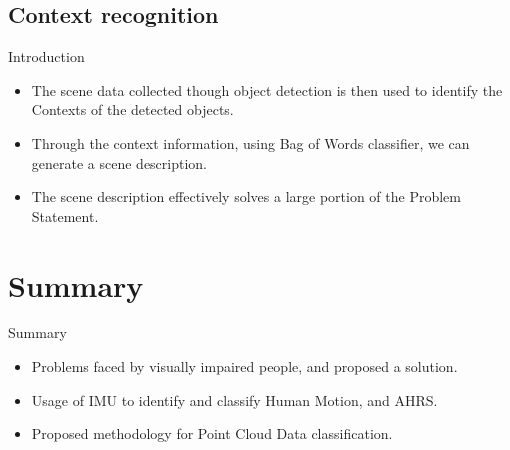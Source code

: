 \documentclass{beamer}
\begin{document}
\subsection{Context recognition}
\begin{frame}{Introduction}
  \begin{itemize}
  \item {
    The scene data collected though object detection is then used to identify the Contexts of the detected objects.
  }
  \item {
    Through the context information, using Bag of Words classifier, we can generate a scene description.
  }
  \item {
    The scene description effectively solves a large portion of the Problem Statement.
  }
  \end{itemize}
\end{frame}

\section*{Summary}

\begin{frame}{Summary}
  \begin{itemize}
  \item {
    Problems faced by visually impaired people, and proposed a solution.
  }
  \item {
    Usage of IMU to identify and classify Human Motion, and AHRS.
  }
  \item {
    Proposed methodology for Point Cloud Data classification.
  }
  \end{itemize}
\end{frame}
\end{document}
